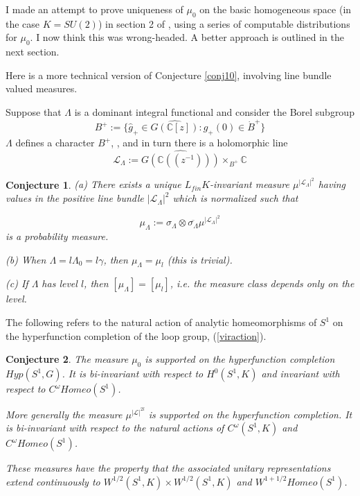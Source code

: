 \documentclass{amsart}
\theoremstyle{conjecture}
\newtheorem{conjecture}{Conjecture}
\theoremstyle{definition}
\theoremstyle{question}
\theoremstyle{questions}
\theoremstyle{remark}
\theoremstyle{remarks}
\theoremstyle{example}
\numberwithin{equation}{section}
\begin{document}
I made an attempt to prove uniqueness of $\mu_0$ on the basic homogeneous space (in the case $K=SU(2)$)
in section 2 of \cite{Pi2}, using a series of computable distributions for $\mu_0$. I now think this was wrong-headed. A better approach
is outlined in the next section.

Here is a more technical version of Conjecture \ref{conj10}, involving line bundle valued measures.

 Suppose that $\Lambda$ is a dominant integral functional and consider
the Borel subgroup
$$B^+:=\{\widehat g_+\in \widehat{G(\mathbb C[z])}:g_+(0)\in \dot B^+\}$$
$\Lambda$ defines a character $B^+$,  , and in turn there is a holomorphic line
$$\mathcal L_{\Lambda}:=\widehat{G(\mathbb C((z^{-1})))}\times_{B^+}\mathbb C $$

\begin{conjecture}\label{conj11} (a) There exists a unique $L_{fin}K$-invariant measure $\mu^{|\mathcal L_{\Lambda}|^2}$ having values in the positive line bundle $|\mathcal L_{\Lambda}|^2$ which is normalized such that

$$\mu_{\Lambda}:=\sigma_{\Lambda}\otimes \overline{\sigma_{\Lambda} } \mu^{|\mathcal L_{\Lambda}|^2}$$ is a probability measure.

(b) When $\Lambda=l\Lambda_0=l\gamma$, then $\mu_{\Lambda}=\mu_l$ (this is trivial).

(c) If $\Lambda$ has level $l$, then  $[\mu_{\Lambda}]=[\mu_l]$, i.e. the measure class depends only on the level.
\end{conjecture}


The following refers to the natural action of analytic
homeomorphisms of $S^1$ on the hyperfunction completion of the loop group, (\ref{viraction}).

\begin{conjecture}\label{conj2} The measure $\mu_0$ is supported on the hyperfunction completion $Hyp(S^1,G)$.
It is bi-invariant with respect to $H^0(S^1,K)$ and invariant with respect to $C^{\omega}Homeo(S^1)$.

More generally the measure $\mu^{|\mathcal L|^{2l}}$ is supported on the hyperfunction completion.
It is bi-invariant with respect to the natural actions of $C^{\omega}(S^1,K)$ and $C^{\omega}Homeo(S^1)$.

These measures have the property that the associated unitary representations extend continuously to $W^{1/2}(S^1,K) \times W^{1/2}(S^1,K)$ and $W^{1+1/2}Homeo(S^1)$.
\end{conjecture}
\end{document}
